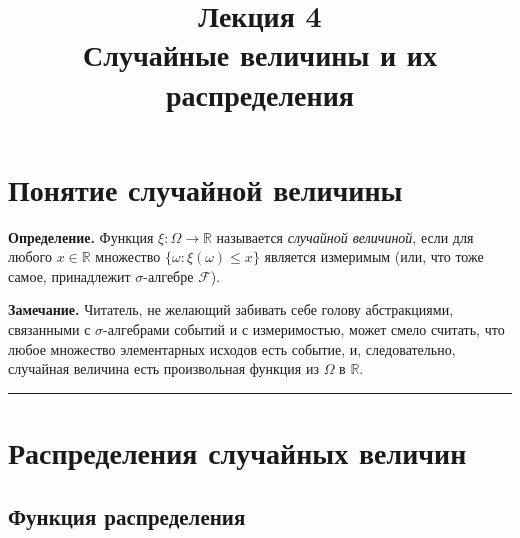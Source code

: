 \documentclass[11pt,a4paper]{article}
\title{
      {\Large Лекция 4} \\
      Случайные величины и их распределения
    }
\date{}
\begin{document}
  \maketitle
  \thispagestyle{empty}
  \tableofcontents
  \newpage



    \hypertarget{ux43fux43eux43dux44fux442ux438ux435-ux441ux43bux443ux447ux430ux439ux43dux43eux439-ux432ux435ux43bux438ux447ux438ux43dux44b}{%
\section{Понятие случайной
величины}\label{ux43fux43eux43dux44fux442ux438ux435-ux441ux43bux443ux447ux430ux439ux43dux43eux439-ux432ux435ux43bux438ux447ux438ux43dux44b}}

\textbf{Определение.} Функция \(\xi: \Omega \rightarrow \mathbb{R}\)
называется \emph{случайной величиной}, если для любого
\(x \in \mathbb{R}\) множество \(\{\omega : \xi(\omega) \le x\}\)
является измеримым (или, что тоже самое, принадлежит \(\sigma\)-алгебре
\(\mathcal{F}\)).

\textbf{Замечание.} Читатель, не желающий забивать себе голову
абстракциями, связанными с \(\sigma\)-алгебрами событий и с
измеримостью, может смело считать, что любое множество элементарных
исходов есть событие, и, следовательно, случайная величина есть
произвольная функция из \(\Omega\) в \(\mathbb{R}\).

    \begin{center}\rule{0.5\linewidth}{0.5pt}\end{center}

    \hypertarget{ux440ux430ux441ux43fux440ux435ux434ux435ux43bux435ux43dux438ux44f-ux441ux43bux443ux447ux430ux439ux43dux44bux445-ux432ux435ux43bux438ux447ux438ux43d}{%
\section{Распределения случайных
величин}\label{ux440ux430ux441ux43fux440ux435ux434ux435ux43bux435ux43dux438ux44f-ux441ux43bux443ux447ux430ux439ux43dux44bux445-ux432ux435ux43bux438ux447ux438ux43d}}

\hypertarget{ux444ux443ux43dux43aux446ux438ux44f-ux440ux430ux441ux43fux440ux435ux434ux435ux43bux435ux43dux438ux44f}{%
\subsection{Функция
распределения}\label{ux444ux443ux43dux43aux446ux438ux44f-ux440ux430ux441ux43fux440ux435ux434ux435ux43bux435ux43dux438ux44f}}
\end{document}
